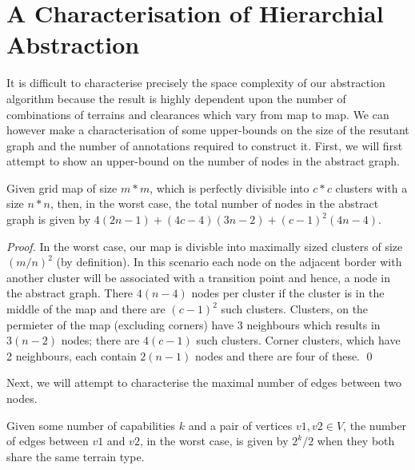 \section{A Characterisation of Hierarchial Abstraction}
It is difficult to characterise precisely the space complexity of our abstraction algorithm because the result is highly dependent upon the number of combinations of terrains and clearances which vary from map to map. We can however make a characterisation of some upper-bounds on the size of the resutant graph and the number of annotations required to construct it. 
\medskip
First, we will first attempt to show an upper-bound on the number of nodes in the abstract graph. 
\begin{lemma}
\label{aha-lemma:maxnodes}
Given grid map of size $m*m$, which is perfectly divisible into $c*c$ clusters with a size $n*n$, then, in the worst case, the total number of nodes in the abstract graph is given by $4(2n-1) + (4c - 4)(3n-2) + (c-1)^2(4n-4)$.
\end{lemma}

\begin{proof}
In the worst case, our map is divisble into maximally sized clusters of size $(m/n)^2$ (by definition). In this scenario each node on the adjacent border with another cluster will be associated with a transition point and hence, a node in the abstract graph.
There $4(n-4)$ nodes per cluster if the cluster is in the middle of the map and there are $(c-1)^2$ such clusters. Clusters, on the permieter of the map (excluding corners) have 3 neighbours which results in $3(n-2)$ nodes; there are $4(c-1)$ such clusters. Corner clusters, which have 2 neighbours, each contain $2(n-1)$ nodes and there are four of these. \qed
\end{proof}
Next, we will attempt to characterise the maximal number of edges between two nodes.
\begin{lemma}
\label{aha-lemma:maxedges}
Given some number of capabilities $k$ and a pair of vertices $v1, v2 \in V$, the number of edges between $v1$ and $v2$, in the worst case, is given by $2^k/2$ when they both share the same terrain type.
\end{lemma}

